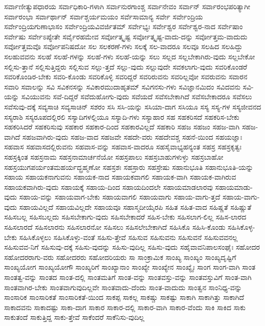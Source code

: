 {ಸರ್ವಾಣೀತ್ಯುಪಧಾರಯ
ಸರ್ವಾಧಿಕಾರಿ-ಗಳಾಗಿ
ಸರ್ವಾನುರಗಾಂಶ್ಚ
ಸರ್ವಾನೇವಂ
ಸರ್ವಾನ್
ಸರ್ವಾರಂಭಪರಿತ್ಯಾಗೀ
ಸರ್ವಾರಂಭಾ
ಸರ್ವಾರ್ಥಾನ್
ಸರ್ವಾಶ್ಚರ್ಯಮಯಂ
ಸರ್ವೆಸಾಮಾನ್ಯ
ಸರ್ವೇ
ಸರ್ವೇಂದ್ರಿಯ
ಸರ್ವೇಂದ್ರಿಯಗುಣಾಭಾಸಂ
ಸರ್ವೇಂದ್ರಿಯವಿವರ್ಜಿತಮ್
ಸರ್ವೇಭ್ಯಃ
ಸರ್ವೇಶ್ವರ
ಸರ್ವೇಶ್ವರ-ನಾದ
ಸರ್ವೇಷಾಂ
ಸರ್ವೇಷು
ಸರ್ವೇಽಪ್ಯೇತೇ
ಸರ್ವೈರಹಮೇವ
ಸರ್ವೋತ್ಕೃಷ್ಟ
ಸರ್ವೋತ್ಕೃಷ್ಟ-ವಾದು-ದನ್ನು
ಸರ್ವೋತ್ತಮ-ವಾದುದು
ಸರ್ವೋತ್ತಮವೊ
ಸರ್ವೋಪನಿಷದೋ
ಸಲ
ಸಲಕರಣೆ-ಗಳು
ಸಲಕ್ಕೆ
ಸಲ-ವಾದರೂ
ಸಲವೂ
ಸಲಹಿದ
ಸಲಹಿದ್ದು
ಸಲಹುವವನು
ಸಲಹೆ
ಸಲಹೆ-ಗಳನ್ನು
ಸಲಹೆ-ಗಳು
ಸಲಹೆ-ಯನ್ನು
ಸಲು
ಸಲ್ಲದ
ಸಲ್ಲಬೇಕಾಗಿರು-ವುದು
ಸಲ್ಲಬೇಕೋ
ಸಲ್ಲಿಸು-ತ್ತಾನೆ
ಸಲ್ಲಿಸುತ್ತಿದ್ದರು
ಸಲ್ಲಿಸುವ
ಸಲ್ಲು-ತ್ತದೆ
ಸಲ್ಲು-ವುದು
ಸಲ್ಲುವುದೇ
ಸವಕಲಾಗು-ವುದು
ಸವರಿಕೊಂಡರೆ
ಸವರಿಕೊಂಡಿರ-ಬೇಕು
ಸವರಿ-ಕೊಂಡು
ಸವರಿಕೊಳ್ಳಿ
ಸವರಿದ್ದರೆ
ಸವರಿರುವನು
ಸವರಿಲ್ಲವೋ
ಸವರುವನು
ಸವಾರನ
ಸವಾರಿ
ಸವಾಲನ್ನು
ಸವಿ
ಸವಿಕನಸನ್ನು
ಸವಿಕಾರಮುದಾಹೃತಮ್
ಸವಿಗನಸು-ಗಳು
ಸವಿಜ್ಞಾನಮಿದಂ
ಸವಿದವನು
ಸವಿ-ಯನ್ನು
ಸವಿಯುವನು
ಸವೆ-ದಿದ್ದರೆ
ಸವೆದುಹೋಗು-ವುದು
ಸವೆಯದೆ
ಸವೆಸಬೇಕಾಗಿದೆ
ಸವೆಸಬೇಕಾದರೂ
ಸವೆಸಲು
ಸವೆಸುವು-ದಕ್ಕೆ
ಸವ್ಯಸಾಚಿ
ಸವ್ಯಸಾಚಿನ್
ಸಶರಂ
ಸಸಿ
ಸಸಿ-ಯನ್ನು
ಸಸಿಯಾ-ದಾಗ
ಸಸಿಯೂ
ಸಸ್ಯ
ಸಸ್ಯ-ಗಳ
ಸಸ್ಯಜೀವನದ
ಸಸ್ಯರಾಶಿ
ಸಸ್ಯರೂಪದಲ್ಲಿರಲಿ
ಸಸ್ಯಾದಿಗಳಲ್ಲಿಯೂ
ಸಸ್ಯಾದಿ-ಗಳು
ಸಸ್ಯಾಹಾರ
ಸಹ
ಸಹಕರಿಸದೆ
ಸಹಕರಿಸ-ಬೇಕು
ಸಹಕರಿಸಿದರೆ
ಸಹಕರಿಸುವು
ಸಹಕಾರ
ಸಹಕಾರ-ದಿಂದ
ಸಹಕಾರವಿಲ್ಲದೆ
ಸಹಕಾರಿ
ಸಹಜ
ಸಹಜಂ
ಸಹಜ-ವಾಗಿ
ಸಹಜ-ವಾಗಿದೆ
ಸಹಜವಾಗಿರು-ವುದು
ಸಹಜ-ವಾದ
ಸಹಜವೇ
ಸಹದೇ-ವರು
ಸಹದೇವಶ್ಚ
ಸಹನೆ-ಯಿಂದ
ಸಹಯಜ್ಞಾಃ
ಸಹವಾಸ
ಸಹವಾಸದಲ್ಲಿರುವನು
ಸಹವಾಸ-ವನ್ನು
ಸಹವಾಸ-ವಾದರೂ
ಸಹಸೈವಾಭ್ಯಹನ್ಯಂತ
ಸಹಸ್ರ
ಸಹಸ್ರಕೃತ್ವಃ
ಸಹಸ್ರಕ್ಕಿಂತ
ಸಹಸ್ರನಾಮ
ಸಹಸ್ರನಾಮಾರ್ಚನೆಯೋ
ಸಹಸ್ರಪಾಲು
ಸಹಸ್ರಬಾಹುಗಳುಳ್ಳು
ಸಹಸ್ರಬಾಹೋ
ಸಹಸ್ರಯುಗಪರ್ಯಂತಮಹರ್ಯದ್ಬ್ರಹ್ಮಣೋ
ಸಹಸ್ರಶಃ
ಸಹಸ್ರಾರು
ಸಹಸ್ರೇಷು
ಸಹಾನುಭೂತಿ
ಸಹಾನುಭೂತಿ-ಯನ್ನು
ಸಹಾಯ
ಸಹಾಯಕನಾಗುವನು
ಸಹಾಯಕ-ನಾದ
ಸಹಾಯಕವಾಗಲಿ
ಸಹಾಯಕ-ವಾಗಿ
ಸಹಾಯಕ-ವಾಗಿರುವ
ಸಹಾಯಕವಾಗಿರು-ವುದು
ಸಹಾಯಕ್ಕೆ
ಸಹಾಯ-ದಿಂದ
ಸಹಾಯದಿಂದಲೇ
ಸಹಾಯಮಾಡಲಾರವು
ಸಹಾಯಮಾಡು-ವುದು
ಸಹಾಯ-ವನ್ನು
ಸಹಾಯವಾಗ-ಬೇಕು
ಸಹಾಯವಾಗಲಿ
ಸಹಾಯವಾಗು
ಸಹಾಯ-ವಾಗು-ತ್ತದೆ
ಸಹಾಯ-ವಾಗು-ವುದು
ಸಹಾಯವಿಲ್ಲದೆ
ಸಹಾಯವಿಲ್ಲದೇ
ಸಹಾಯವೂ
ಸಹಾಸ್ಮದೀಯೈರಪಿ
ಸಹಿತ
ಸಹಿತ-ವಾದ
ಸಹಿಷ್ಣತೆ
ಸಹಿಷ್ಣುತೆ
ಸಹಿಸಬಲ್ಲ
ಸಹಿಸಬಲ್ಲದು
ಸಹಿಸಬೇಕಾಗು-ವುದು
ಸಹಿಸಬೇಕಾದರೆ
ಸಹಿಸ-ಬೇಕು
ಸಹಿಸಲಾಗ-ಲಿಲ್ಲ
ಸಹಿಸ-ಲಾರದ
ಸಹಿಸಲಾರದೆ
ಸಹಿಸಲಾರನು
ಸಹಿಸಲಾರನೋ
ಸಹಿಸಲು
ಸಹಿಸಲೇಬೇಕಾಗಿದೆ
ಸಹಿಸಿಕೊ
ಸಹಿಸಿ-ಕೊಂಡು
ಸಹಿಸಿಕೊಳ್ಳ-ಬೇಕು
ಸಹಿಸಿಕೊಳ್ಳಲು
ಸಹಿಸಿಕೊಳ್ಳು-ವಂತೆ
ಸಹಿಸು-ತ್ತೇವೆ
ಸಹಿಸುವ
ಸಹಿಸುವನು
ಸಹಿಸುವನೆ
ಸಹಿಸುವವನಲ್ಲ
ಸಹಿಸುವವ-ನಿಗೆ
ಸಹಿಸುವು-ದಕ್ಕೆ
ಸಹಿಸು-ವುದನ್ನು
ಸಹಿಸು-ವುದಿಲ್ಲ
ಸಹಿಸು-ವುದು
ಸಹೈವಾವನಿಪಾಲಸಂಘೈಃ
ಸಹೋದರ
ಸಹೋದರರಾಗು-ವರು
ಸಹೋದರರು
ಸಹೋದರಿಯರು
ಸಾ
ಸಾಂಕ್ರಾಮಿಕ
ಸಾಂಖ್ಯ
ಸಾಂಖ್ಯಂ
ಸಾಂಖ್ಯದೃಷ್ಟಿಗೆ
ಸಾಂಖ್ಯಯೋಗ
ಸಾಂಖ್ಯಯೋಗೌ
ಸಾಂಖ್ಯರಿಗೆ
ಸಾಂಖ್ಯಾನಾಂ
ಸಾಂಖ್ಯೇ
ಸಾಂಖ್ಯೇನ
ಸಾಂಖ್ಯೈಃ
ಸಾಂಗ
ಸಾಂಗ-ವಾಗಿ
ಸಾಂತ
ಸಾಂತತ್ವ-ವನ್ನು
ಸಾಂತದ
ಸಾಂತ-ದಲ್ಲಿ
ಸಾಂತಮತಿಗೆ
ಸಾಂತ-ವನ್ನು
ಸಾಂತವಸ್ತು-ವನ್ನು
ಸಾಂತವಸ್ತುವಿಗೆ
ಸಾಂತ-ವಾಗಿ
ಸಾಂತವಾಗಿರ-ಬೇಕು
ಸಾಂತವಾಗುವುದಿಲ್ಲವೇ
ಸಾಂತವಾದು-ದೆಂದು
ಸಾಂತ-ವಾದುದು
ಸಾಂತ್ವನ
ಸಾಂನಿಧ್ಯ-ವನ್ನು
ಸಾಂಸಾರಿಕ
ಸಾಂಸಾರಿಕತೆ
ಸಾಂಸಾರಿಕತೆ-ಯಿಂದ
ಸಾಕಪ್ಪ
ಸಾಕಲ್ಲ
ಸಾಕಷ್ಚು
ಸಾಕಷ್ಟು
ಸಾಕಾಗಿ
ಸಾಕಾಗಿತ್ತು
ಸಾಕಾಗಿದೆ
ಸಾಕಾದವನು
ಸಾಕಾದಷ್ಟು
ಸಾಕಾ-ದಾಗ
ಸಾಕಾರ
ಸಾಕಾರ-ದಲ್ಲಿ
ಸಾಕಾರ-ವಾಗಿ
ಸಾಕಾರ-ವೆಂದು
ಸಾಕಿ
ಸಾಕಿದ
ಸಾಕು
ಸಾಕುತಂದೆ
ಸಾಕುತ್ತಿದ್ದ
ಸಾಕು-ತ್ತೇವೆ
ಸಾಕೆಂದರೆ
ಸಾಕೆನಿಸು-ವುದಿಲ್ಲ
}
